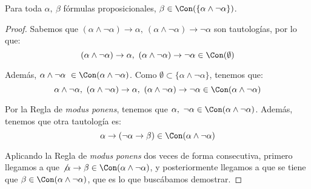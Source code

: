 \begin{prop}
    Para toda $\alpha,~\beta$ fórmulas proposicionales, $\beta\in \Con(\{\alpha\land\lnot\alpha\})$.
    \begin{proof}
        Sabemos que $(\alpha\land \lnot \alpha)\to \alpha,~(\alpha\land \lnot \alpha)\to \lnot \alpha$ son tautologías, por lo que:
        \begin{equation*}
            (\alpha\land \lnot \alpha)\to \alpha,~(\alpha\land \lnot \alpha)\to \lnot \alpha \in \Con(\emptyset)
        \end{equation*}

        Además, $\alpha\land \lnot \alpha~\in \Con(\alpha\land \lnot \alpha)$.
        Como $\emptyset\subset \{\alpha\land \lnot \alpha\}$, tenemos que:
        \begin{equation*}
            \alpha\land \lnot \alpha,~(\alpha\land \lnot \alpha)\to \alpha,~(\alpha\land \lnot \alpha)\to \lnot \alpha \in \Con(\alpha\land \lnot \alpha)
        \end{equation*}

        Por la Regla de \emph{modus ponens}, tenemos que $\alpha,~\lnot \alpha\in \Con(\alpha\land \lnot \alpha)$.
        Además, tenemos que otra tautología es:
        \begin{equation*}
            \alpha\rightarrow(\lnot\alpha\rightarrow\beta)\in \Con(\alpha\land \lnot \alpha)
        \end{equation*}

        Aplicando la Regla de \emph{modus ponens} dos veces de forma consecutiva, primero llegamos a que
        $\not\alpha\rightarrow\beta \in \Con(\alpha\land \lnot \alpha)$,
        y posteriormente llegamos a que se tiene que $\beta \in \Con(\alpha\land \lnot \alpha)$,
        que es lo que buscábamos demostrar.

    \end{proof}
\end{prop}



